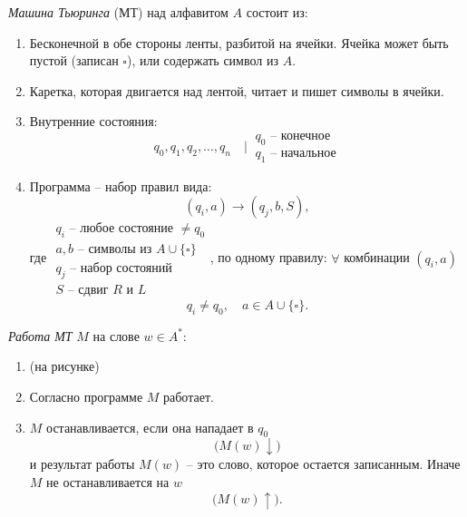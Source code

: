 \begin{definition}
    \emph{Машина Тьюринга} (МТ) над алфавитом $ A $ состоит из:
    \begin{enumerate}
        \item Бесконечной в обе стороны ленты, разбитой на ячейки. Ячейка может быть пустой (записан $ \square $), или содержать символ из $ A $.
              \begin{figure}[H]
                  \centering
                  \label{fig:fig_01}
              \end{figure}
        \item Каретка, которая двигается над лентой, читает и пишет символы в ячейки.
        \item Внутренние состояния:
              \[
                  q_0,q_1,q_2,\ldots,q_n \quad \Bigg| \ \begin{array}{l}
                      q_0 \text{ -- конечное} \\
                      q_1 \text{ -- начальное}
                  \end{array}
              \]
        \item Программа -- набор правил вида:
              \[
                  (q_i,a)\longrightarrow (q_j,b,S),
              \]
              где $ \begin{array}{ll}
                      q_i \text{ -- любое состояние }\ne q_0       \\
                      a,b \text{ -- символы из }A \cup \{\square\} \\
                      q_j \text{ -- набор состояний }              \\
                      S \text{ -- сдвиг }R \text{ и }L
                  \end{array} $,
              по одному правилу: $ \forall $ комбинации $ (q_i,a) $
              \[
                  q_i \ne q_0, \quad a \in A \cup \{\square\}.
              \]
    \end{enumerate}
\end{definition}

\begin{definition}[Работа МТ]
    \emph{Работа МТ} $ M $ на слове $ w \in A^* $:
    \begin{enumerate}
        \item (на рисунке)
              \begin{figure}[H]
                  \centering
                  \label{fig:fig_02}
              \end{figure}
        \item Согласно программе $ M $ работает.
        \item $ M $ останавливается, если она нападает в $ q_0 $
              \[
                  \bigl(M(w)\downarrow\bigr)
              \]
              и результат работы $ M(w) $ -- это слово, которое остается записанным. Иначе $ M $ не останавливается на $ w $
              \[
                  \bigl(M(w)\uparrow\bigr).
              \]
    \end{enumerate}
\end{definition}

